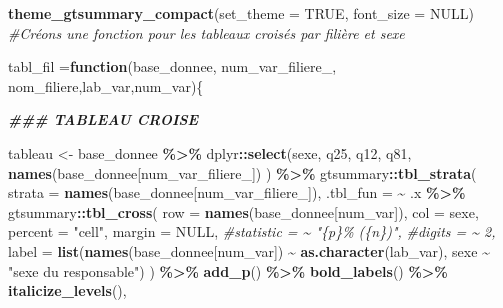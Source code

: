 \documentclass[
]{article}
\newenvironment{Shaded}{\begin{snugshade}}{\end{snugshade}}
\newcommand{\AttributeTok}[1]{\textcolor[rgb]{0.13,0.29,0.53}{#1}}
\newcommand{\CommentTok}[1]{\textcolor[rgb]{0.56,0.35,0.01}{\textit{#1}}}
\newcommand{\ConstantTok}[1]{\textcolor[rgb]{0.56,0.35,0.01}{#1}}
\newcommand{\ControlFlowTok}[1]{\textcolor[rgb]{0.13,0.29,0.53}{\textbf{#1}}}
\newcommand{\DocumentationTok}[1]{\textcolor[rgb]{0.56,0.35,0.01}{\textbf{\textit{#1}}}}
\newcommand{\FunctionTok}[1]{\textcolor[rgb]{0.13,0.29,0.53}{\textbf{#1}}}
\newcommand{\NormalTok}[1]{#1}
\newcommand{\OtherTok}[1]{\textcolor[rgb]{0.56,0.35,0.01}{#1}}
\newcommand{\SpecialCharTok}[1]{\textcolor[rgb]{0.81,0.36,0.00}{\textbf{#1}}}
\newcommand{\StringTok}[1]{\textcolor[rgb]{0.31,0.60,0.02}{#1}}
\begin{document}
\begin{Shaded}
\begin{Highlighting}[]
\FunctionTok{theme\_gtsummary\_compact}\NormalTok{(}\AttributeTok{set\_theme =} \ConstantTok{TRUE}\NormalTok{, }\AttributeTok{font\_size =} \ConstantTok{NULL}\NormalTok{)}
      \CommentTok{\#Créons une fonction pour les tableaux croisés par filière et sexe}


\NormalTok{tabl\_fil }\OtherTok{=}\ControlFlowTok{function}\NormalTok{(base\_donnee, num\_var\_filiere\_, nom\_filiere,lab\_var,num\_var)\{}

                         \DocumentationTok{\#\#\# TABLEAU CROISE}
  
\NormalTok{  tableau }\OtherTok{\textless{}{-}}\NormalTok{ base\_donnee }\SpecialCharTok{\%\textgreater{}\%}
\NormalTok{  dplyr}\SpecialCharTok{::}\FunctionTok{select}\NormalTok{(sexe, q25, q12, q81, }\FunctionTok{names}\NormalTok{(base\_donnee[num\_var\_filiere\_]) }
\NormalTok{                ) }\SpecialCharTok{\%\textgreater{}\%}
\NormalTok{  gtsummary}\SpecialCharTok{::}\FunctionTok{tbl\_strata}\NormalTok{(}
    \AttributeTok{strata =} \FunctionTok{names}\NormalTok{(base\_donnee[num\_var\_filiere\_]),}
    \AttributeTok{.tbl\_fun =} \SpecialCharTok{\textasciitilde{}}\NormalTok{ .x }\SpecialCharTok{\%\textgreater{}\%}
\NormalTok{      gtsummary}\SpecialCharTok{::}\FunctionTok{tbl\_cross}\NormalTok{(}
        \AttributeTok{row =} \FunctionTok{names}\NormalTok{(base\_donnee[num\_var]),}
        \AttributeTok{col =}\NormalTok{ sexe,}
        \AttributeTok{percent =} \StringTok{"cell"}\NormalTok{,}
        \AttributeTok{margin =} \ConstantTok{NULL}\NormalTok{,}
        \CommentTok{\#statistic = \textasciitilde{} "\{p\}\% (\{n\})",}
        \CommentTok{\#digits = \textasciitilde{} 2,}
        \AttributeTok{label =} \FunctionTok{list}\NormalTok{(}\FunctionTok{names}\NormalTok{(base\_donnee[num\_var]) }\SpecialCharTok{\textasciitilde{}} \FunctionTok{as.character}\NormalTok{(lab\_var),}
\NormalTok{                     sexe }\SpecialCharTok{\textasciitilde{}} \StringTok{"sexe du responsable"}\NormalTok{)}
\NormalTok{        ) }\SpecialCharTok{\%\textgreater{}\%} \FunctionTok{add\_p}\NormalTok{() }\SpecialCharTok{\%\textgreater{}\%}
      \FunctionTok{bold\_labels}\NormalTok{() }\SpecialCharTok{\%\textgreater{}\%}
      \FunctionTok{italicize\_levels}\NormalTok{(),}
    

\end{Highlighting}
\end{Shaded}
\end{document}
